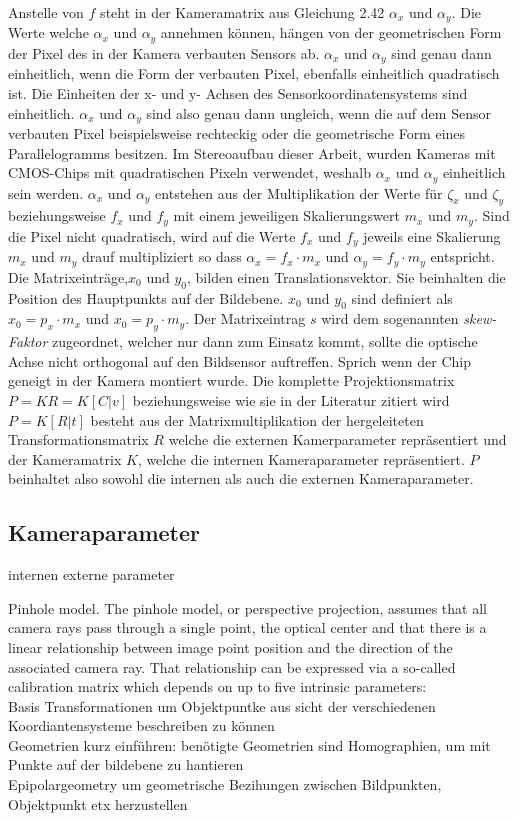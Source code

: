 Anstelle von $f$ steht in der Kameramatrix aus Gleichung 2.42 $\alpha_x$ und $\alpha_y$. Die Werte welche $\alpha_x$ und $\alpha_y$ annehmen können, hängen von der geometrischen Form der Pixel des in der Kamera verbauten Sensors ab\cite{HZ,Photonik}.  $\alpha_x$ und $\alpha_y$ sind genau dann einheitlich, wenn die Form der verbauten Pixel, ebenfalls einheitlich quadratisch ist. Die Einheiten der x- und y- Achsen des Sensorkoordinatensystems sind einheitlich. $\alpha_x$ und $\alpha_y$ sind also genau dann ungleich, wenn die auf dem Sensor verbauten Pixel beispielsweise rechteckig oder die geometrische Form eines Parallelogramms besitzen\cite{HZ}. Im Stereoaufbau dieser Arbeit, wurden Kameras mit CMOS-Chips mit quadratischen Pixeln verwendet, weshalb $\alpha_x$ und $\alpha_y$ einheitlich sein werden. $\alpha_x$ und $\alpha_y$ entstehen aus der Multiplikation der Werte für $\zeta_x$ und $\zeta_y$ beziehungsweise  $f_x$ und $f_y$ mit einem jeweiligen Skalierungswert $m_x$ und $m_y$. Sind die Pixel nicht quadratisch, wird auf die Werte $f_x$ und $f_y$ jeweils eine Skalierung $m_x$ und $m_y$ drauf multipliziert so dass  $\alpha_x = f_x \cdot m_x$ und $\alpha_y = f_y \cdot m_y$ entspricht\cite{HZ}. Die Matrixeinträge,$x_{0}$ und $y_{0}$, bilden einen Translationsvektor. Sie beinhalten die Position des Hauptpunkts auf der Bildebene. $x_{0}$ und $y_{0}$ sind definiert als $x_{0} = p_x \cdot m_x$ und $x_{0} = p_y \cdot m_y$. Der Matrixeintrag $s$ wird dem sogenannten \textit{skew-Faktor} zugeordnet, welcher nur dann zum Einsatz kommt, sollte die optische Achse nicht orthogonal auf den Bildsensor auftreffen. Sprich wenn der Chip geneigt in der Kamera montiert wurde\cite{HZ}. Die komplette Projektionsmatrix $P=KR=K[C|v]$ beziehungsweise wie sie in der Literatur zitiert wird $P=K[R|t]$\cite{HZ} besteht aus der Matrixmultiplikation der hergeleiteten Transformationsmatrix $R$ welche die externen Kamerparameter repräsentiert und der Kameramatrix $K$, welche die internen Kameraparameter repräsentiert. $P$ beinhaltet also sowohl die internen als auch die externen Kameraparameter.

\subsection{Kameraparameter}

internen externe parameter\cite{Jianzhong}

Pinhole model. The pinhole model, or perspective projection,
assumes that all camera rays pass through a single point, the optical
center and that there is a linear relationship between image point
position and the direction of the associated camera ray. That relationship
can be expressed via a so-called calibration matrix which depends
on up to five intrinsic parameters:\cite{CamerModels.}\\



Basis Transformationen um Objektpuntke aus sicht der verschiedenen Koordiantensysteme beschreiben zu können \\
Geometrien kurz einführen: benötigte Geometrien sind Homographien, um mit Punkte auf der bildebene zu hantieren \\
Epipolargeometry um geometrische Bezihungen zwischen Bildpunkten, Objektpunkt etx herzustellen